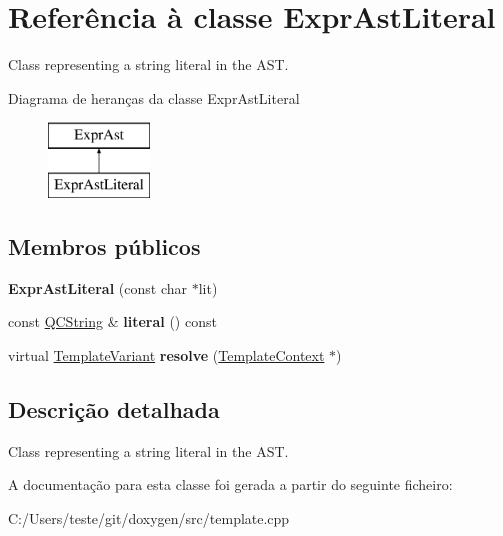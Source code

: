 \hypertarget{class_expr_ast_literal}{\section{Referência à classe Expr\-Ast\-Literal}
\label{class_expr_ast_literal}
}


Class representing a string literal in the A\-S\-T.  


Diagrama de heranças da classe Expr\-Ast\-Literal\begin{figure}[H]
\begin{center}
\leavevmode
\includegraphics[height=2.000000cm]{class_expr_ast_literal}
\end{center}
\end{figure}
\subsection*{Membros públicos}
\begin{DoxyCompactItemize}
\item 
\hypertarget{class_expr_ast_literal_af1f81ffee34aec0a3d668f37527dfa7a}{{\bfseries Expr\-Ast\-Literal} (const char $\ast$lit)}\label{class_expr_ast_literal_af1f81ffee34aec0a3d668f37527dfa7a}

\item 
\hypertarget{class_expr_ast_literal_a394553272fc3e31cf6fd32abf53e9c80}{const \hyperlink{class_q_c_string}{Q\-C\-String} \& {\bfseries literal} () const }\label{class_expr_ast_literal_a394553272fc3e31cf6fd32abf53e9c80}

\item 
\hypertarget{class_expr_ast_literal_af33b31cdb1179449bc274eec57c73f39}{virtual \hyperlink{class_template_variant}{Template\-Variant} {\bfseries resolve} (\hyperlink{class_template_context}{Template\-Context} $\ast$)}\label{class_expr_ast_literal_af33b31cdb1179449bc274eec57c73f39}

\end{DoxyCompactItemize}


\subsection{Descrição detalhada}
Class representing a string literal in the A\-S\-T. 

A documentação para esta classe foi gerada a partir do seguinte ficheiro\-:\begin{DoxyCompactItemize}
\item 
C\-:/\-Users/teste/git/doxygen/src/template.\-cpp\end{DoxyCompactItemize}
